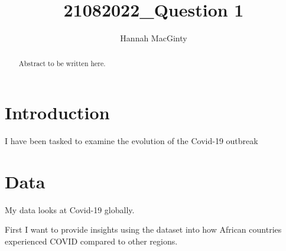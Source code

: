 \documentclass[11pt,preprint, authoryear]{elsarticle}
\numberwithin{equation}{section}
\numberwithin{figure}{section}
\numberwithin{table}{section}
\begin{document}
\begin{frontmatter}  %

\title{21082022\_Question 1}





\author[Add1]{Hannah MacGinty}





\address[Add1]{Stellenbosch, South Africa}


\begin{abstract}
\small{
Abstract to be written here.
}
\end{abstract}

\vspace{1cm}





\vspace{0.5cm}

\end{frontmatter}

\setcounter{footnote}{0}



\pagestyle{fancy}
\chead{}
\rhead{}
\lfoot{}
\rfoot{}
\lhead{}
\cfoot{}


\headsep 35pt %




\hypertarget{introduction}{%
\section{\texorpdfstring{Introduction
\label{Introduction}}{Introduction }}\label{introduction}}

I have been tasked to examine the evolution of the Covid-19 outbreak

\hypertarget{data}{%
\section*{Data}\label{data}}

My data looks at Covid-19 globally.

First I want to provide insights using the dataset into how African
countries experienced COVID compared to other regions.
\end{document}
